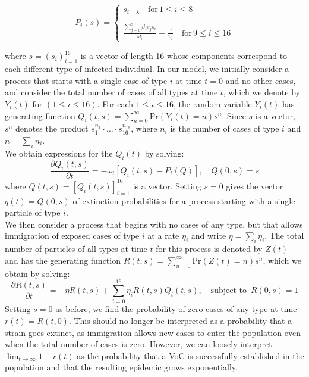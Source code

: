 \documentclass{article}
\begin{document}
\begin{equation} \label{offspring}
P_i(s) =  \begin{cases}
 s_{i+8} \quad \text{for} \, 1 \leq i \leq 8 \\
\\
\frac{\sum_{j=0}^8 \beta_j s_j s_i}{\omega_i} + \frac{\gamma}{\omega_i} \quad \text{for} \, 9 \leq i \leq 16 
\end{cases}
\end{equation}


where $s = (s_i)_{i=1}^{16}$ is a vector of length 16 whose components correspond to each different type of infected individual. In our model, we initially consider a process that starts with a single case of type $i$ at time $t=0$ and no other cases, and consider the total number of cases of all types at time $t$, which we denote by $Y_i(t)$ for $ (1 \leq i \leq 16)$.  For each $1 \leq i \leq 16$, the random variable $Y_i(t)$ has generating function $Q_i(t, s) = \sum_{n=0}^\infty{\mathrm{Pr}}(Y_i(t) = n)s^n$. Since $s$ is a vector, $s^n$ denotes the product $s_1^{n_1} \cdot \dots \cdot s_{16}^{n_{16}}$, where $n_i$ is the number of cases of type $i$ and $n = \sum_i n_i$. \\ 

We obtain expressions for the $Q_i(t)$ by solving:
\begin{equation}
    \frac{\partial Q_i(t, s)}{\partial t} = -\omega_i[Q_i(t, s) - P_i(Q)], \quad Q(0, s) = s \label{Qeq}
\end{equation}
where $Q(t, s) = [Q_i(t, s)]_{i=1}^{16}$ is a vector. Setting $s=0$ gives the vector  $q(t) = Q(0, s)$ of extinction probabilities for a process starting with a single particle of type $i$. \\

We then consider a process that begins with no cases of any type, but that allows immigration of exposed cases of type $i$ at a rate $\eta_i$ and write $\eta = \sum_i \eta_i$. The total number of particles of all types at time $t$ for this process is denoted by $Z(t)$ and has the generating function $R(t, s) = \sum_{n=0}^\infty {\mathrm{Pr}}(Z(t) = n)s^n$, which we obtain by solving:
\begin{equation}
    \frac{\partial R(t, s)}{\partial t} = -\eta R(t, s) + \sum_{i=0}^{16} \eta_i R(t, s)Q_i(t, s), \quad \text{subject to }\, R(0, s) = 1 \label{Req}
\end{equation}
Setting $s=0$ as before, we find the probability of zero cases of any type at time $r(t) = R(t, 0)$. This should no longer be interpreted as a probability that a strain goes extinct, as immigration allows new cases to enter the population even when the total number of cases is zero. However, we can loosely interpret $\lim_{t \to \infty}1 - r(t)$ as the probability that a VoC is successfully established in the population and that the resulting epidemic grows exponentially. 
\end{document}
